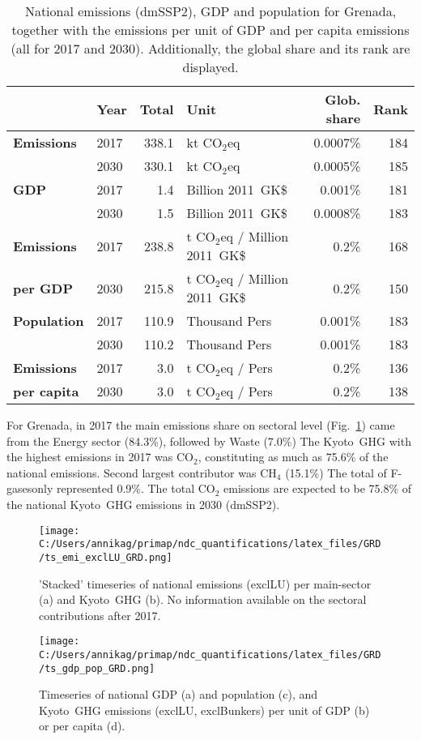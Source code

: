 \documentclass[12pt]{article}
\begin{document}
 \begin{table}[H]
 \centering
 \caption{National emissions (dmSSP2), GDP and population for Grenada, together with the emissions per unit of GDP and per capita emissions (all for 2017 and 2030). 
 Additionally, the global share and its rank are displayed.}
 \label{tab:overview}
 \begin{tabular}{l || l r l r r}
 \bfseries  & \bfseries Year & \bfseries Total & \bfseries Unit & \bfseries Glob. share & \bfseries Rank \tabularnewline \hline \hline
 \bfseries Emissions & 2017 & 338.1 & kt CO$_2$eq & 0.0007\% & 184 \tabularnewline 
 \bfseries  & 2030 & 330.1 & kt CO$_2$eq & 0.0005\% & 185 \tabularnewline \hline
 \bfseries GDP & 2017 & 1.4 & Billion 2011~GK\$ & 0.001\% & 181 \tabularnewline 
 \bfseries  & 2030 & 1.5 & Billion 2011~GK\$ & 0.0008\% & 183 \tabularnewline \hline
 \bfseries Emissions & 2017 & 238.8 & t CO$_2$eq / Million 2011~GK\$ & 0.2\% & 168 \tabularnewline 
 \bfseries per GDP & 2030 & 215.8 & t CO$_2$eq / Million 2011~GK\$ & 0.2\% & 150 \tabularnewline \hline
 \bfseries Population & 2017 & 110.9 & Thousand Pers & 0.001\% & 183 \tabularnewline 
 \bfseries  & 2030 & 110.2 & Thousand Pers & 0.001\% & 183 \tabularnewline \hline
 \bfseries Emissions & 2017 & 3.0 & t CO$_2$eq /  Pers & 0.2\% & 136 \tabularnewline 
 \bfseries per capita & 2030 & 3.0 & t CO$_2$eq /  Pers & 0.2\% & 138 \tabularnewline 
 \end{tabular}
 \end{table}

 For Grenada, in 2017 the main emissions share on sectoral level (Fig.~\ref{fig:tsEmi}) came from the Energy sector (84.3\%), followed by Waste (7.0\%)
 The Kyoto~GHG with the highest emissions in 2017 was CO$_2$, constituting as much as 75.6\% of the national emissions. 
 Second largest contributor was CH$_4$ (15.1\%)
 The total of F-gasesonly represented 0.9\%.
 The total CO$_2$ emissions are expected to be 75.8\% of the national Kyoto~GHG emissions in 2030 (dmSSP2).

 \begin{figure}[H]
 \centering
 \texttt{[image: C:/Users/annikag/primap/ndc\_quantifications/latex\_files/GRD/ts\_emi\_exclLU\_GRD.png]}
 \caption{'Stacked' timeseries of national emissions (exclLU) per main-sector (a) and Kyoto~GHG (b). 
 No information available on the sectoral contributions after 2017.}
 \label{fig:tsEmi}
 \end{figure}

 \begin{figure}[H]
 \centering
 \texttt{[image: C:/Users/annikag/primap/ndc\_quantifications/latex\_files/GRD/ts\_gdp\_pop\_GRD.png]}
 \caption{Timeseries of national GDP (a) and population (c), and Kyoto~GHG emissions (exclLU, exclBunkers) per unit of GDP (b) or per capita (d).}
 \label{fig:tsSocioEco}
 \end{figure}
\end{document}
